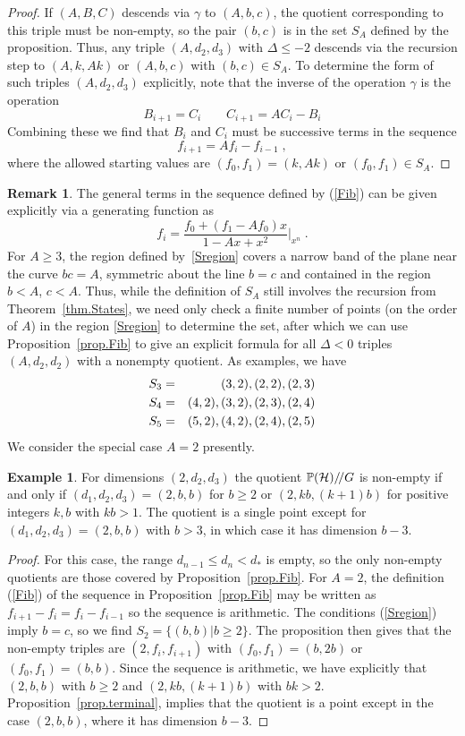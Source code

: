 \documentclass[12pt]{article}
\theoremstyle{definition}
\newtheorem{remark}[theorem]{Remark}
\newtheorem{example}[theorem]{Example}
\newcommand{\be}{\begin{equation}}
\newcommand{\ee}{\end{equation}}
\newcommand{\bea}{\begin{eqnarray}}
\newcommand{\eea}{\end{eqnarray}}
\newcommand{\GITquot}{/\!/}
\begin{document}
\begin{proof}
If $(A,B,C)$ descends via $\gamma$ to $(A,b,c)$, the quotient corresponding to this triple must be non-empty, so the pair $(b,c)$ is in the set $S_A$ defined by the proposition. Thus, any triple $(A,d_2,d_3)$ with $\Delta \le -2$ descends via the recursion step to $(A,k,Ak)$ or $(A,b,c)$ with $(b,c) \in S_A$. To determine the form of such triples $(A,d_2,d_3)$ explicitly, note that the inverse of the operation $\gamma$ is the operation
\be
B_{i+1} = C_i \qquad C_{i+1} = A C_i - B_i
\ee
Combining these we find that $B_i$ and $C_i$ must be successive terms in the sequence
\be
f_{i+1} = A f_i - f_{i-1} \; ,
\ee
where the allowed starting values are $(f_0,f_1) = (k,Ak)$ or $(f_0, f_1) \in S_A$.
\end{proof}
\begin{remark}
The general terms in the sequence defined by (\ref{Fib}) can be given explicitly via a generating function as
\be
f_i = \frac{f_0 + (f_1 - A f_0) x}{1 - Ax + x^2}|_{x^n} \; .
\ee
For $A \ge 3$, the region defined by~\eqref{Sregion} covers a narrow band of the plane near the curve $bc=A$, symmetric about the line $b=c$ and contained in the region $b < A$, $c < A$. Thus, while the definition of $S_A$ still involves the recursion from Theorem~\ref{thm.States}, we need only check a finite number of points (on the order of $A$) in the region \eqref{Sregion} to determine the set, after which we can use Proposition~\ref{prop.Fib} to give an explicit formula for all $\Delta < 0$ triples $(A,d_2,d_2)$ with a nonempty quotient. As examples, we have
\bea
S_3 &=& {(3,2),(2,2),(2,3)} \cr
S_4 &=& {(4,2),(3,2),(2,3),(2,4)} \cr
S_5 &=& {(5,2),(4,2),(2,4),(2,5)}
\eea
We consider the special case $A=2$ presently.
\end{remark}
\begin{example}
For dimensions $(2,d_2,d_3)$ the quotient $\mathbb P({\cal H}) \GITquot  G$ is non-empty if and only if $(d_1,d_2,d_3) = (2,b,b)$ for $b \ge 2$ or $(2,kb,(k+1)b)$ for positive integers $k,b$ with $kb > 1$. The quotient is a single point except for $(d_1,d_2,d_3) = (2,b,b)$ with $b>3$, in which case it has dimension $b-3$.
\end{example}
\begin{proof}
For this case, the range $d_{n-1} \le d_n < d_*$ is empty, so the only non-empty quotients are those covered by Proposition~\ref{prop.Fib}. For $A=2$, the definition (\ref{Fib}) of the sequence in Proposition~\ref{prop.Fib} may be written as $f_{i+1} - f_{i} = f_i - f_{i-1}$ so the sequence is arithmetic. The conditions (\ref{Sregion}) imply $b=c$, so we find $S_2 = \{(b,b)|b \ge 2\}$. The proposition then gives that the non-empty triples are $(2,f_i,f_{i+1})$ with $(f_0,f_1) = (b,2b)$ or $(f_0,f_1) = (b,b)$. Since the sequence is arithmetic, we have explicitly that $(2,b,b)$ with $b \ge 2$ and $(2,kb,(k+1)b)$ with $bk > 2$. Proposition~\ref{prop.terminal}, implies that the quotient is a point except in the case $(2,b,b)$, where it has dimension $b-3$.
\end{proof}
\end{document}
